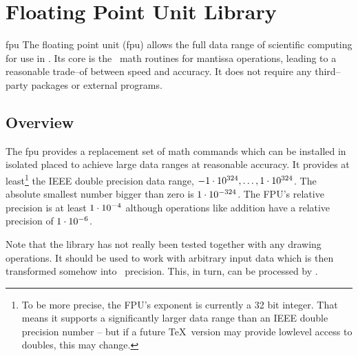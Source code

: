 %
%
%


\section{Floating Point Unit Library}
{}
\label{pgfmath-floatunit}
\label{section-library-fpu}

\begingroup
{}

\begin{pgflibrary}{fpu}
  The floating point unit (fpu) allows the full data range of
  scientific computing for use in \pgfname. Its core is the \pgfname\
  math routines for mantissa operations, leading to a reasonable
  trade--of between speed and accuracy. It does not require any
  third--party packages or external programs. 
\end{pgflibrary}

\subsection{Overview}
The fpu provides a replacement set of math commands which can be
installed in isolated placed to achieve large data ranges at
reasonable accuracy. It provides at least\footnote{To be more precise,
  the FPU's exponent is currently a 32 bit integer. That means it
  supports a significantly larger data range than an IEEE double
  precision number -- but if a future \TeX\ version may provide
  lowlevel access to doubles, this may change.} the IEEE double
precision data range, $\pgfmathprintnumber{-1e+324}, \dotsc,
\pgfmathprintnumber{+1e324}$. The absolute smallest number bigger than
zero is $\pgfmathprintnumber{1e-324}$. The FPU's relative precision is
at least $\pgfmathprintnumber{1e-4}$ although operations like addition
have a relative precision of $\pgfmathprintnumber{1e-6}$. 

Note that the library has not really been tested together with any
drawing operations. It should be used to work with arbitrary input
data which is then transformed somehow into \pgfname\ precision. This,
in turn, can be processed by \pgfname. 

